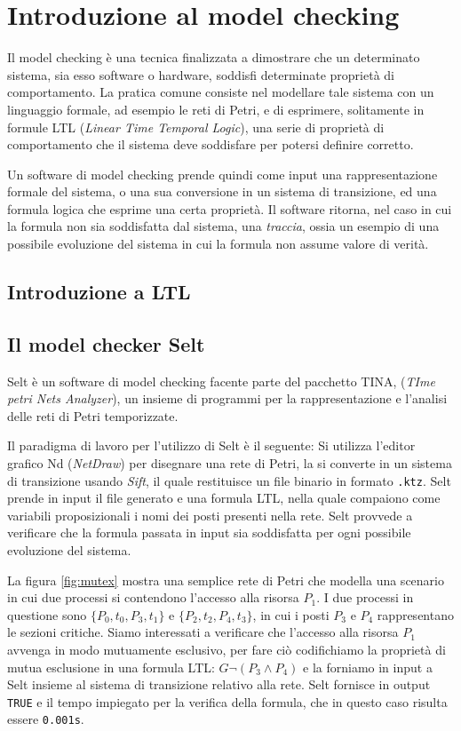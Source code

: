 \section{Introduzione al model checking}
Il model checking è una tecnica finalizzata a dimostrare che un determinato
sistema, sia esso software o hardware, soddisfi determinate proprietà di
comportamento.
La pratica comune consiste nel modellare tale sistema con un linguaggio 
formale, ad esempio le reti di Petri, e di esprimere, solitamente in
formule LTL (\emph{Linear Time Temporal Logic}), una serie di 
proprietà di comportamento che il sistema deve soddisfare per
potersi definire corretto.

Un software di model checking prende quindi come input una rappresentazione
formale del sistema, o una sua conversione in un sistema di transizione,
ed una formula logica che esprime una certa proprietà.
Il software ritorna, nel caso in cui la formula non sia soddisfatta dal 
sistema, una \emph{traccia}, ossia un esempio di una possibile 
evoluzione del sistema in cui la formula non assume valore di verità.

\subsection{Introduzione a LTL}

\subsection{Il model checker Selt}
Selt è un software di model checking facente parte del pacchetto TINA,
(\emph{TIme petri Nets Analyzer}), un insieme di programmi per la
rappresentazione e l'analisi delle reti di Petri temporizzate.

Il paradigma di lavoro per l'utilizzo di Selt è il seguente: 
Si utilizza l'editor grafico Nd (\emph{NetDraw}) per disegnare una rete di
Petri, la si converte in un sistema di transizione usando \emph{Sift},
il quale restituisce un file binario in formato \texttt{.ktz}.
Selt prende in input il file generato e una formula LTL, 
nella quale compaiono come variabili proposizionali i nomi 
dei posti presenti nella rete. Selt provvede a verificare che
la formula passata in input sia soddisfatta per ogni possibile evoluzione
del sistema.

La figura \ref{fig:mutex} mostra una semplice rete di Petri che
modella una scenario in cui due processi si contendono l'accesso 
alla risorsa $P_1$.
I due processi in questione sono $\{P_0, t_0, P_3, t_1\}$ e 
$\{P_2, t_2, P_4, t_3\}$, in cui i posti $P_3$ e $P_4$ rappresentano le 
sezioni critiche.
Siamo interessati a verificare che l'accesso alla risorsa $P_1$ avvenga
in modo mutuamente esclusivo, 
per fare ciò codifichiamo la proprietà di mutua esclusione in una formula
LTL: $G \lnot (P_3 \land P_4)$ e la forniamo in input a Selt insieme al
sistema di transizione relativo alla rete.
Selt fornisce in output \texttt{TRUE} e il tempo impiegato per la verifica
della formula, che in questo caso risulta essere \texttt{0.001s}.

